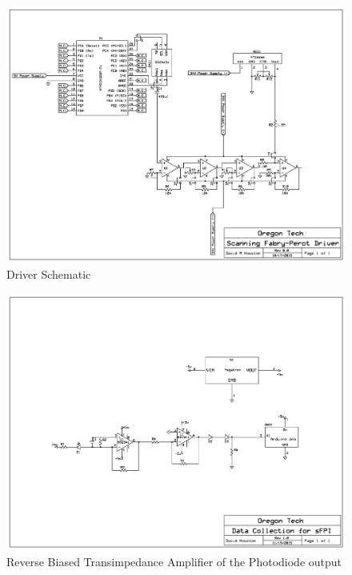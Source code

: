 \documentclass[12pt,journal]{IEEEtran}
\begin{document}
\begin{appendices}
\begin{figure}[h!]
	\centering
	\includegraphics[width=\textwidth]{schematic-driver.png}
	\caption[Block Diagram]{Driver Schematic}
	\label{schm:driver-schematic}
\end{figure}
\newpage
\begin{figure}[h!]
	\centering
	\includegraphics[width=\textwidth]{schematic-photodiode.png}
	\caption[Photodiode Output Circuit]{Reverse Biased Transimpedance Amplifier of the Photodiode output}
	\label{schm:photodiode}
\end{figure}
\newpage
\begin{figure}[h!]
	\centering

\end{figure}
\end{appendices}
\end{document}
